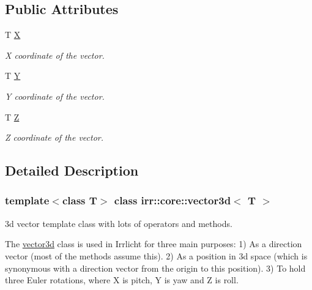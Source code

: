 \subsection*{Public Attributes}
\begin{DoxyCompactItemize}
\item 
\mbox{\label{classirr_1_1core_1_1vector3d_a8c9ed06774dc668112bcefacb6e7732b}} 
T \hyperlink{classirr_1_1core_1_1vector3d_a8c9ed06774dc668112bcefacb6e7732b}{X}
\begin{DoxyCompactList}\small\item\em X coordinate of the vector. \end{DoxyCompactList}\item 
\mbox{\label{classirr_1_1core_1_1vector3d_af8f87c2fe0ce717ade7c3d7419302fbd}} 
T \hyperlink{classirr_1_1core_1_1vector3d_af8f87c2fe0ce717ade7c3d7419302fbd}{Y}
\begin{DoxyCompactList}\small\item\em Y coordinate of the vector. \end{DoxyCompactList}\item 
\mbox{\label{classirr_1_1core_1_1vector3d_ac2beb702e718c3579971348981b220ed}} 
T \hyperlink{classirr_1_1core_1_1vector3d_ac2beb702e718c3579971348981b220ed}{Z}
\begin{DoxyCompactList}\small\item\em Z coordinate of the vector. \end{DoxyCompactList}\end{DoxyCompactItemize}


\subsection{Detailed Description}
\subsubsection*{template$<$class T$>$\newline
class irr\+::core\+::vector3d$<$ T $>$}

3d vector template class with lots of operators and methods. 

The \hyperlink{classirr_1_1core_1_1vector3d}{vector3d} class is used in Irrlicht for three main purposes\+: 1) As a direction vector (most of the methods assume this). 2) As a position in 3d space (which is synonymous with a direction vector from the origin to this position). 3) To hold three Euler rotations, where X is pitch, Y is yaw and Z is roll. 

